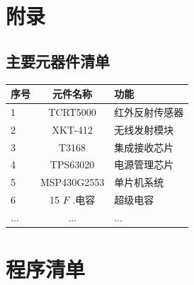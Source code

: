 \documentclass[UTF8]{ctexart}
\begin{document}
\section*{附录}
\begin{appendix}
	\renewcommand{\appendixname}{Appendix~\Alph{section}}
	\section{主要元器件清单}
	
\begin{table} [htbp]   
	\label{Tab1} 
	\setlength{\tabcolsep}{3mm}
	\begin{tabular}{lcl} 
		\toprule 
		序号 & 元件名称  & 功能 \\ 
		\midrule 
		1& TCRT5000 & 红外反射传感器 \\
		2& XKT-412 & 无线发射模块 \\
		3& T3168 & 集成接收芯片\\
		4& TPS63020 & 电源管理芯片 \\
		5& MSP430G2553 & 单片机系统 \\
		6& 15 $ F $ .电容  & 超级电容\\
		... & ...& ...\\
		\bottomrule 
	\end{tabular} 
\end{table}
\end{appendix}

		\section{程序清单}
	
\end{document}
